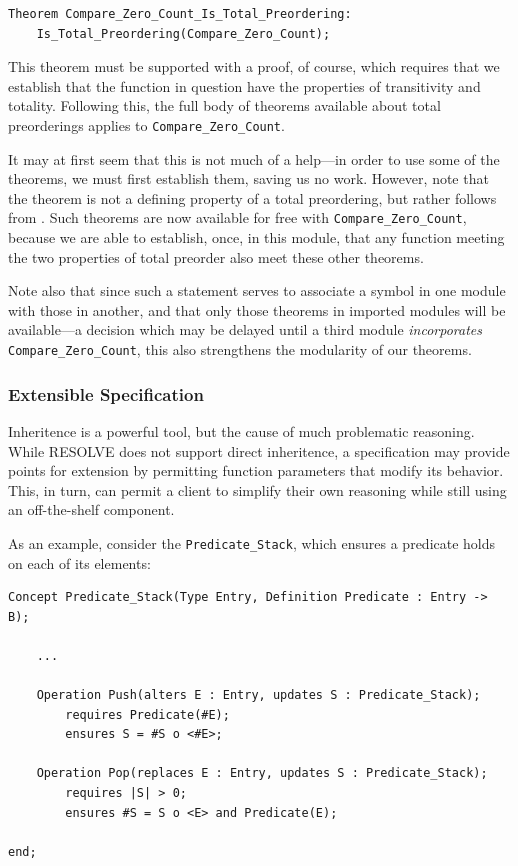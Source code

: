 \begin{lstlisting}
Theorem Compare_Zero_Count_Is_Total_Preordering:
	Is_Total_Preordering(Compare_Zero_Count);
\end{lstlisting} 

This theorem must be supported with a proof, of course, which requires that we establish that the function in question have the properties of transitivity and totality.  Following this, the full body of theorems available about total preorderings applies to \texttt{Compare\_Zero\_Count}.

It may at first seem that this is not much of a help---in order to use some of the theorems, we must first establish them, saving us no work.  However, note that the \texttt{} theorem is not a defining property of a total preordering, but rather follows from \texttt{\totalTheorem}.  Such theorems are now available for free with \texttt{Compare\_Zero\_Count}, because we are able to establish, once, in this module, that any function meeting the two properties of total preorder also meet these other theorems.

Note also that since such a statement serves to associate a symbol in one module with those in another, and that only those theorems in imported modules will be available---a decision which may be delayed until a third module \emph{incorporates} \texttt{Compare\_Zero\_Count}, this also strengthens the modularity of our theorems.

		\subsubsection{Extensible Specification\label{extensibleSpecification}}

Inheritence is a powerful tool, but the cause of much problematic reasoning\cite{something}.  While RESOLVE does not support direct inheritence, a specification may provide points for extension by permitting function parameters that modify its behavior.  This, in turn, can permit a client to simplify their own reasoning while still using an off-the-shelf component.

As an example, consider the \texttt{Predicate\_Stack}, which ensures a predicate holds on each of its elements:

\begin{lstlisting}
Concept Predicate_Stack(Type Entry, Definition Predicate : Entry -> B);

	...

	Operation Push(alters E : Entry, updates S : Predicate_Stack);
		requires Predicate(#E);
		ensures S = #S o <#E>;

	Operation Pop(replaces E : Entry, updates S : Predicate_Stack);
		requires |S| > 0;
		ensures #S = S o <E> and Predicate(E);

end;
\end{lstlisting}

